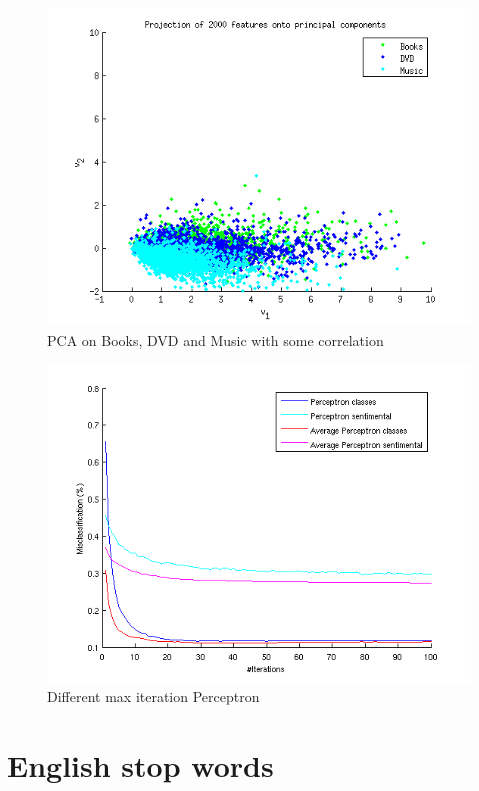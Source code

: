 \begin{figure}[H]
\centering
\includegraphics[scale = 1]{../Plottar/pca_somecorr.png}
\caption{PCA on Books, DVD and Music with some correlation}
\end{figure} 

\begin{figure}[H]
\centering
\includegraphics[scale = 1]{../Plottar/perceptron_2000words_unigram_10foldcv_classes-high_sentimental-low.png}
\caption{Different max iteration Perceptron}
\end{figure} 

\chapter{English stop words}


